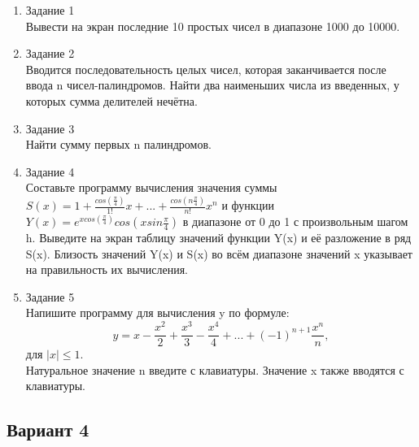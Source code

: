 \documentclass[a4paper]{article}
\begin{document}
	\begin{enumerate} 
		\item Задание 1 \\
			Вывести на экран последние 10 простых чисел в диапазоне 1000 до 10000.\\
		\item Задание 2\\
			Вводится последовательность целых чисел, которая заканчивается после ввода n чисел-палиндромов. 
			Найти два наименьших числа из введенных, у которых сумма делителей нечётна.\\
		\item Задание 3 \\
			Найти сумму первых n палиндромов.\\
		\item Задание 4 \\
			Составьте программу вычисления значения суммы  $S(x)=1+\frac{cos(\frac{\pi}{4})}{1!}x+...+\frac{cos(n\frac{\pi}{4})}{n!}x^n$
			и функции $Y(x)=e^{xcos(\frac{\pi}{4})}cos(xsin\frac{\pi}{4})$ в диапазоне от 0 до 1
			с произвольным шагом h. Выведите на экран таблицу значений функции Y(x) и её разложение в ряд S(x). Близость значений Y(x) и S(x) во всём диапазоне
			значений x указывает на правильность их вычисления.\\
		\item Задание 5 \\
			Напишите программу для вычисления y по формуле:\\
			$$y=x-\frac{x^2}{2}+\frac{x^3}{3}-\frac{x^4}{4}+...+(-1)^{n+1}\frac{x^n}{n},$$ для $|x|\leq1.$\\
			Натуральное значение n введите с клавиатуры. Значение x также вводятся с клавиатуры.\\
	\end{enumerate}

	\begin{center}
		\subsection*{Вариант 4}
	\end{center}
\end{document}
